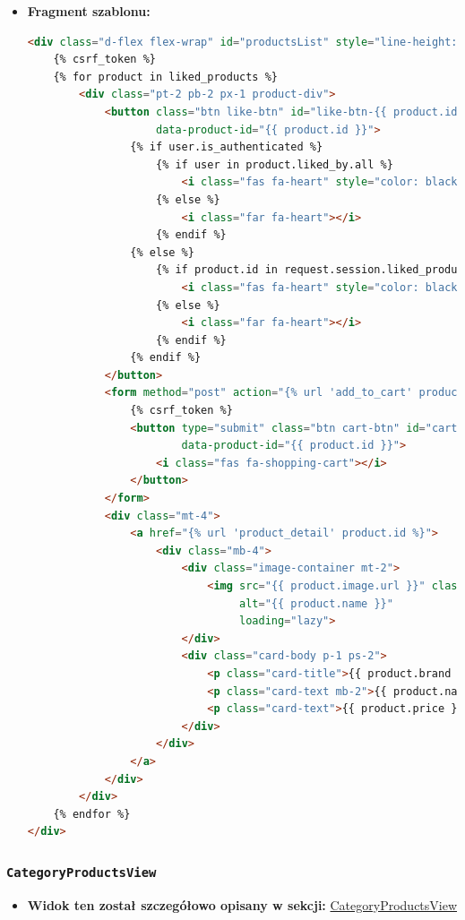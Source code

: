 \documentclass[12pt,a4paper,oneside]{article}
\theoremstyle{definition}
\numberwithin{equation}{section}
\begin{document}
\begin{itemize}
    \item \textbf{Fragment szablonu:}
        \begin{lstlisting}[language=HTML, caption=Fragment szablonu favorites.html]
<div class="d-flex flex-wrap" id="productsList" style="line-height: 1.3;">
    {% csrf_token %}
    {% for product in liked_products %}
        <div class="pt-2 pb-2 px-1 product-div">
            <button class="btn like-btn" id="like-btn-{{ product.id }}"
                    data-product-id="{{ product.id }}">
                {% if user.is_authenticated %}
                    {% if user in product.liked_by.all %}
                        <i class="fas fa-heart" style="color: black;"></i>
                    {% else %}
                        <i class="far fa-heart"></i>
                    {% endif %}
                {% else %}
                    {% if product.id in request.session.liked_products %}
                        <i class="fas fa-heart" style="color: black;"></i>
                    {% else %}
                        <i class="far fa-heart"></i>
                    {% endif %}
                {% endif %}
            </button>
            <form method="post" action="{% url 'add_to_cart' product.id %}" class="d-inline">
                {% csrf_token %}
                <button type="submit" class="btn cart-btn" id="cart-btn-{{ product.id }}"
                        data-product-id="{{ product.id }}">
                    <i class="fas fa-shopping-cart"></i>
                </button>
            </form>
            <div class="mt-4">
                <a href="{% url 'product_detail' product.id %}">
                    <div class="mb-4">
                        <div class="image-container mt-2">
                            <img src="{{ product.image.url }}" class="card-img-top"
                                 alt="{{ product.name }}"
                                 loading="lazy">
                        </div>
                        <div class="card-body p-1 ps-2">
                            <p class="card-title">{{ product.brand }}</p>
                            <p class="card-text mb-2">{{ product.name }}</p>
                            <p class="card-text">{{ product.price }} zl</p>
                        </div>
                    </div>
                </a>
            </div>
        </div>
    {% endfor %}
</div>
        \end{lstlisting}
\end{itemize}

\subsubsection*{\texttt{CategoryProductsView}}
\begin{itemize}
    \item \textbf{Widok ten został szczegółowo opisany w sekcji: }\hyperref[CategoryProductsView]{CategoryProductsView}
\end{itemize}
\end{document}
